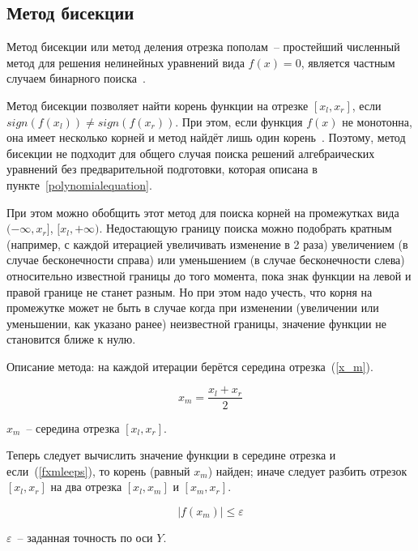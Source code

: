 \subsection{Метод бисекции}\label{bisection}
Метод бисекции или метод деления отрезка пополам~-- простейший численный метод для решения нелинейных уравнений вида \(f(x)=0\),
является частным случаем бинарного поиска~\cite{bisectionkaw}.

Метод бисекции позволяет найти корень функции на отрезке \([x_l, x_r]\), если \(sign(f(x_l))\neq sign(f(x_r))\).
При этом, если функция \(f(x)\) не монотонна,
она имеет несколько корней и метод найдёт лишь один корень~\cite{bisectionkaw}.
Поэтому, метод бисекции не подходит для общего случая поиска решений алгебраических уравнений
без предварительной подготовки, которая описана в пункте~\ref{polynomialequation}.

При этом можно обобщить этот метод для поиска корней на промежутках вида \((-\infty, x_r]\), \([x_l, +\infty)\).
Недостающую границу поиска можно подобрать кратным (например, с каждой итерацией увеличивать изменение в 2 раза) увеличением (в случае бесконечности справа)
или уменьшением (в случае бесконечности слева) относительно известной границы до того момента, пока
знак функции на левой и правой границе не станет разным. Но при этом надо учесть, что корня на промежутке
может не быть в случае когда при изменении (увеличении или уменьшении, как указано ранее) неизвестной границы, значение функции не становится
ближе к нулю.

Описание метода: на каждой итерации берётся середина отрезка~(\ref{x_m}).

\begin{equation}\label{x_m}
  x_m = \frac{x_l + x_r}{2}
\end{equation}

\begin{Underequation}
  \(x_m\)~-- середина отрезка \([x_l, x_r]\).
\end{Underequation}

Теперь следует вычислить значение функции в середине отрезка и если~(\ref{fxmleeps}), то корень (равный \(x_m\)) найден;
иначе следует разбить отрезок \([x_l, x_r]\) на два отрезка \([x_l, x_m]\) и \([x_m, x_r]\).

\begin{equation}\label{fxmleeps}
  \left|f(x_m)\right| \leqslant \varepsilon
\end{equation}

\begin{Underequation}
  \(\varepsilon\)~-- заданная точность по оси \(Y\).
\end{Underequation}

